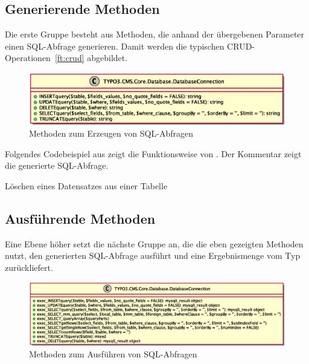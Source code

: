 \newpage

\subsection{Generierende Methoden}

Die erste Gruppe besteht aus Methoden, die anhand der übergebenen Parameter einen SQL-Abfrage generieren. Damit werden die typischen CRUD-Operationen~\ref{ft:crud} abgebildet.

\begin{figure}[H]
	\centering
	\includegraphics[scale=0.65]{gfx/uml/DatabaseConnectionCreationMethods.eps}
	\caption{Methoden zum Erzeugen von SQL-Abfragen}
	\label{fig:databaseConnectionWithSQLGenerationMethods}
\end{figure}

Folgendes Codebeispiel aus  zeigt die Funktionsweise von . Der Kommentar zeigt die generierte SQL-Abfrage.

\begin{listing}[H]
	\caption{Löschen eines Datensatzes aus einer Tabelle}
	\label{lst:databaseOldDeleteExample}
\end{listing}

\subsection{Ausführende Methoden}
Eine Ebene höher setzt die nächste Gruppe an, die die eben gezeigten Methoden nutzt, den generierten SQL-Abfrage ausführt und eine Ergebnismenge vom Typ  zurückliefert.

\begin{figure}[H]
\centering
\includegraphics[scale=0.5]{gfx/uml/DatabaseConnectionExecuteMethods.eps}
\caption{Methoden zum Ausführen von SQL-Abfragen}
\label{fig:databaseConnectionWithSQLExecutionMethods}
\end{figure}

